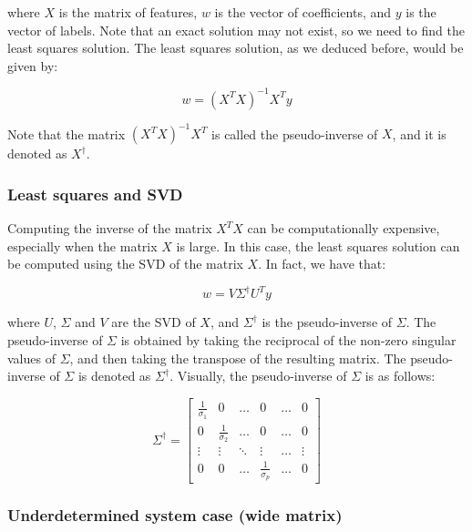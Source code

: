 where $X$ is the matrix of features, $w$ is the vector of coefficients, and $y$ is the vector of labels. Note that an exact 
solution may not exist, so we need to find the least squares solution. The least squares solution, as we deduced before,
would be given by:

\begin{equation}
    w = (X^T X)^{-1} X^T y
\end{equation}

Note that the matrix $(X^T X)^{-1} X^T$ is called the pseudo-inverse of $X$, and it is denoted as $X^{\dagger}$.

\subsubsection{Least squares and SVD}

Computing the inverse of the matrix $X^T X$ can be computationally expensive, especially when the matrix $X$ is large.
In this case, the least squares solution can be computed using the SVD of the matrix $X$. In fact, we have that:

\begin{equation}
    w = V \Sigma^{\dagger} U^T y
\end{equation}

where $U$, $\Sigma$ and $V$ are the SVD of $X$, and $\Sigma^{\dagger}$ is the pseudo-inverse of $\Sigma$. The pseudo-inverse
of $\Sigma$ is obtained by taking the reciprocal of the non-zero singular values of $\Sigma$, and then taking the transpose of
the resulting matrix. The pseudo-inverse of $\Sigma$ is denoted as $\Sigma^{\dagger}$. Visually, the pseudo-inverse of $\Sigma$
is as follows:

\begin{equation}
    \Sigma^{\dagger} = \begin{bmatrix}
        \frac{1}{\sigma_1} & 0 & \ldots & 0 & \ldots & 0 \\
        0 & \frac{1}{\sigma_2} & \ldots & 0 & \ldots & 0 \\
        \vdots & \vdots & \ddots & \vdots & \ldots & \vdots \\
        0 & 0 & \ldots & \frac{1}{\sigma_p} & \ldots & 0
    \end{bmatrix}
\end{equation}

\subsubsection{Underdetermined system case (wide matrix)}

